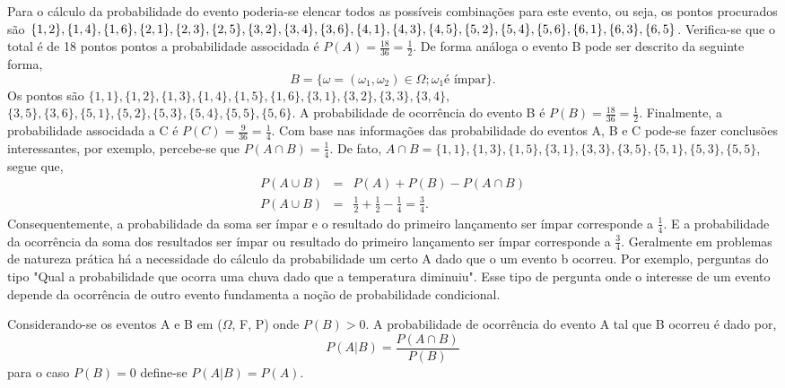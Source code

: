 Para o c\'{a}lculo da probabilidade do evento poderia-se elencar todos as poss\'{i}veis
combina\c{c}\~{o}es para este evento, ou seja, os pontos procurados s\~{a}o $\{1,2 \},\{1,4 \},\{1,6 \},\{2,1 \},\\
\{2, 3\}, \{2,5 \} ,\{3,2 \}, \{3,4 \}, \{3,6 \}, \{4,1 \}, \{4,3 \}, \{4,5 \}, \{5,2\},\{5,4 \},  
\{5,6 \}, \{6,1 \}, \{6, 3 \},\\ \{6, 5 \}$.  Verifica-se que o total \'e de 18 pontos
pontos a probabilidade associdada \'{e} $P(A) = \frac{18} {36} = \frac{1} {2}$.  De forma an\'aloga o
evento B pode ser descrito da seguinte forma, 
	\begin{equation*} 
		B = \{\omega = (\omega_1, \omega_2) \in
		\Omega; \omega_1 \textrm {\'{e} \'{i}mpar} \}. 
	\end{equation*}
Os pontos  s\~{a}o $\{1,1\},\{1,2 \},\{1,3 \}, \{1,4 \}, \{1, 5\}, \{1,6 \},\{3,1 \},\{3,2 \},\{3,3 \}, \{3,4 \}$,\\
$\{3,5\},\{3,6 \}, \{5,1 \},\{5,2 \},\{5,3 \}, \{5,4 \}, \{5, 5\}, \{5,6 \}$.  A probabilidade de
ocorr\^{e}ncia do evento B \'{e} $P(B) = \frac{18} {36} = \frac {1} {2}$. Finalmente, a
probabilidade associdada a C \'e $P(C) = \frac{9}{36} = \frac {1} {4}$. Com base nas
informa\c{c}\~{o}es das probabilidade do eventos A, B e C pode-se fazer conclus\~{o}es
 interessantes, por exemplo, percebe-se que $P(A \cap B) = \frac{1}{4}$. De fato, $A \cap B = \{1,1
\},\{1,3 \},\{1,5 \}, \{3,1 \}, \{3,3 \},\{3,5 \}, \{5,1 \}, \{5,3 \},\{5, 5 \}$, segue que,
		  \begin{eqnarray*}
			  P(A \cup B) &=&  P(A) + P(B) -P(A \cap B) \\ \nonumber P(A \cup B) &=&  \frac{1}
			  {2} + \frac{1} {2} - \frac{1} {4} = \frac{3} {4}. 
		  \end{eqnarray*}
Consequentemente, a probabilidade da soma ser \'{i}mpar e o resultado do primeiro lan\c{c}amento ser \'{i}mpar
corresponde a $\frac{1} {4}$. E a probabilidade da ocorr\^{e}ncia da soma dos resultados ser
\'{i}mpar ou resultado do primeiro lan\c{c}amento ser \'{i}mpar corresponde a $\frac{3} {4}$.
Geralmente em problemas de natureza pr\'atica h\'a a necessidade do c\'alculo da probabilidade um
certo A dado que o um evento b ocorreu.  Por exemplo, perguntas do tipo "Qual a probabilidade que
ocorra uma chuva dado que a temperatura diminuiu". Esse tipo de pergunta onde o interesse de um
evento depende da ocorr\^encia de outro evento fundamenta a no\c c\~ao de probabilidade condicional.
	\begin{defin}
		\label{dcon}
		Considerando-se os eventos A e B em ($\Omega$,
		F, P) onde $P(B)  > 0$. A probabilidade de ocorr\^{e}ncia do evento A tal que B ocorreu \'e dado
		por,
		\begin{equation*}
			P(A|B) = \frac{P(A \cap B)} {P(B)} 
		\end{equation*} para o caso $P(B) = 0$
		define-se $P(A|B ) = P(A) $.
	\end{defin}
